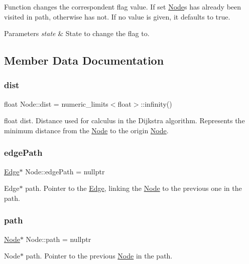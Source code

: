 Function changes the correspondent flag value. If set \hyperlink{class_node}{Node}\textquotesingle{}s has already been visited in path, otherwise has not. If no value is given, it defaults to true.


\begin{DoxyParams}{Parameters}
{\em state} & State to change the flag to. \\
\hline
\end{DoxyParams}


\subsection{Member Data Documentation}
\hypertarget{class_node_ae7efda4ec8512d44445f058a479589d3}{}\label{class_node_ae7efda4ec8512d44445f058a479589d3} 
\subsubsection{\texorpdfstring{dist}{dist}}
{\footnotesize\ttfamily float Node\+::dist = numeric\+\_\+limits$<$float$>$\+::infinity()}

float dist. Distance used for calculus in the Dijkstra algorithm. Represents the minimum distance from the \hyperlink{class_node}{Node} to the origin \hyperlink{class_node}{Node}. \hypertarget{class_node_a547c4e0904d03f97ca32a66408b11584}{}\label{class_node_a547c4e0904d03f97ca32a66408b11584} 
\subsubsection{\texorpdfstring{edge\+Path}{edgePath}}
{\footnotesize\ttfamily \hyperlink{class_edge}{Edge}$\ast$ Node\+::edge\+Path = nullptr}

Edge$\ast$ path. Pointer to the \hyperlink{class_edge}{Edge}, linking the \hyperlink{class_node}{Node} to the previous one in the path. \hypertarget{class_node_a569c555f532e04a5ef976a54cd3c82a0}{}\label{class_node_a569c555f532e04a5ef976a54cd3c82a0} 
\subsubsection{\texorpdfstring{path}{path}}
{\footnotesize\ttfamily \hyperlink{class_node}{Node}$\ast$ Node\+::path = nullptr}

Node$\ast$ path. Pointer to the previous \hyperlink{class_node}{Node} in the path. \hypertarget{class_node_ac54c0bde41664161566c30ccf4f8a53e}{}\label{class_node_ac54c0bde41664161566c30ccf4f8a53e} 
